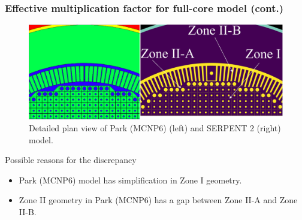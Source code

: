 \begin{frame}
  \frametitle{Effective multiplication factor for full-core model (cont.)}
   \vspace{-0.25in}
  \begin{figure}[t]
   \hspace*{-0.39in}
   \includegraphics[height=0.57\textheight]{./images/park_plan_view.png}
   \vspace{-0.05in}
   \caption{Detailed plan view of Park (MCNP6) (left) \cite{park_whole_2015}
      and SERPENT 2 (right) model.}
    \end{figure}
    \vspace{-0.15in}

    \begin{block}{Possible reasons for the discrepancy}
       \begin{itemize}
         \item Park (MCNP6) model has simplification in Zone I geometry.
         \item Zone II geometry in Park (MCNP6) has a gap between
           Zone II-A and Zone II-B.
       \end{itemize}
       \end{block}
\end{frame}

